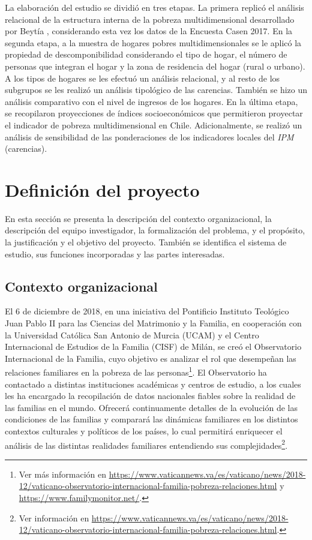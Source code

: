\documentclass[12pt,letterpaper,spanish]{article}
\begin{document}
La elaboración del estudio se dividió en tres etapas. La primera replicó el análisis relacional de la estructura interna de la pobreza multidimensional desarrollado por Beytía \cite{Beytia2016LaMultidimensional}, considerando esta vez los datos de la Encuesta Casen 2017. En la segunda etapa, a la muestra de hogares pobres multidimensionales se le aplicó la propiedad de descomponibilidad considerando el tipo de hogar, el número de personas que integran el hogar y la zona de residencia del hogar (rural o urbano). A los tipos de hogares se les efectuó un análisis relacional, y al resto de los subgrupos se les realizó un análisis tipológico de las carencias. También se hizo un análisis comparativo con el nivel de ingresos de los hogares. En la última etapa, se recopilaron proyecciones de índices socioeconómicos que permitieron proyectar el indicador de pobreza multidimensional en Chile. Adicionalmente, se realizó un análisis de sensibilidad de las ponderaciones de los indicadores locales del \textit{IPM} (carencias).





 


\newpage
\section{Definición del proyecto} %
En esta sección se presenta la descripción del contexto organizacional, la descripción del equipo investigador, la formalización del problema, y el propósito, la justificación y el objetivo del proyecto. También se identifica el sistema de estudio, sus funciones incorporadas y las partes interesadas.

\subsection{Contexto organizacional}
El 6 de diciembre de 2018, en una iniciativa del Pontificio Instituto Teológico Juan Pablo II para las Ciencias del Matrimonio y la Familia, en cooperación con la Universidad Católica San Antonio de Murcia (UCAM) y el Centro Internacional de Estudios de la Familia (CISF) de Milán, se creó el Observatorio Internacional de la Familia, cuyo objetivo es analizar el rol que desempeñan las relaciones familiares en la pobreza de las personas\footnote{Ver más información en \url{https://www.vaticannews.va/es/vaticano/news/2018-12/vaticano-observatorio-internacional-familia-pobreza-relaciones.html} y \url{https://www.familymonitor.net/}.}. El Observatorio ha contactado a distintas instituciones académicas y centros de estudio, a los cuales les ha encargado la recopilación de datos nacionales fiables sobre la realidad de las familias en el mundo. Ofrecerá continuamente detalles de la evolución de las condiciones de las familias y comparará las dinámicas familiares en los distintos contextos culturales y políticos de los países, lo cual permitirá enriquecer el análisis de las distintas realidades familiares entendiendo sus complejidades\footnote{Ver información en \url{https://www.vaticannews.va/es/vaticano/news/2018-12/vaticano-observatorio-internacional-familia-pobreza-relaciones.html}.}. 
\end{document}
